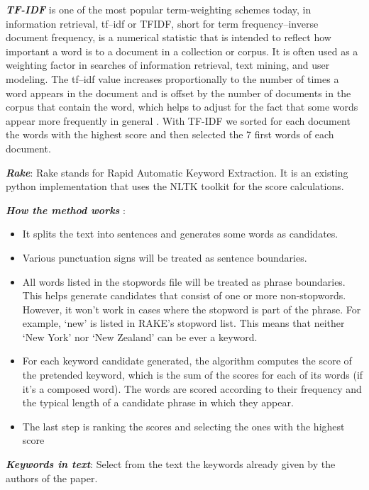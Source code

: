 \documentclass[article,twocolumn]{IEEEtran}
\providecommand{\tightlist}{%
      \setlength{\itemsep}{0pt}\setlength{\parskip}{0pt}}
\begin{document}
\textbf{\emph{TF-IDF}} is one of the most popular term-weighting schemes
today, in information retrieval, tf--idf or TFIDF, short for term
frequency--inverse document frequency, is a numerical statistic that is
intended to reflect how important a word is to a document in a
collection or corpus. It is often used as a weighting factor in searches
of information retrieval, text mining, and user modeling. The tf--idf
value increases proportionally to the number of times a word appears in
the document and is offset by the number of documents in the corpus that
contain the word, which helps to adjust for the fact that some words
appear more frequently in general \cite{Tf-idf}. With TF-IDF we sorted
for each document the words with the highest score and then selected the
7 first words of each document.

    \textbf{\emph{Rake}}: Rake stands for Rapid Automatic Keyword
Extraction. It is an existing python implementation that uses the NLTK
toolkit for the score calculations.

\textbf{\emph{How the method works}} :

\begin{itemize}
\tightlist
\item
  It splits the text into sentences and generates some words as
  candidates.\\
\item
  Various punctuation signs will be treated as sentence boundaries.
\item
  All words listed in the stopwords file will be treated as phrase
  boundaries. This helps generate candidates that consist of one or more
  non-stopwords. However, it won't work in cases where the stopword is
  part of the phrase. For example, `new' is listed in RAKE's stopword
  list. This means that neither `New York' nor `New Zealand' can be ever
  a keyword.
\item
  For each keyword candidate generated, the algorithm computes the score
  of the pretended keyword, which is the sum of the scores for each of
  its words (if it's a composed word). The words are scored according to
  their frequency and the typical length of a candidate phrase in which
  they appear.
\item
  The last step is ranking the scores and selecting the ones with the
  highest score
\end{itemize}

    \textbf{\emph{Keywords in text}}: Select from the text the keywords
already given by the authors of the paper.
\end{document}
